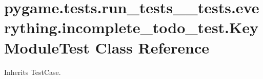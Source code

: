 \hypertarget{classpygame_1_1tests_1_1run__tests____tests_1_1everything_1_1incomplete__todo__test_1_1_key_module_test}{}\section{pygame.\+tests.\+run\+\_\+tests\+\_\+\+\_\+tests.\+everything.\+incomplete\+\_\+todo\+\_\+test.\+Key\+Module\+Test Class Reference}
\label{classpygame_1_1tests_1_1run__tests____tests_1_1everything_1_1incomplete__todo__test_1_1_key_module_test}


Inherits Test\+Case.

